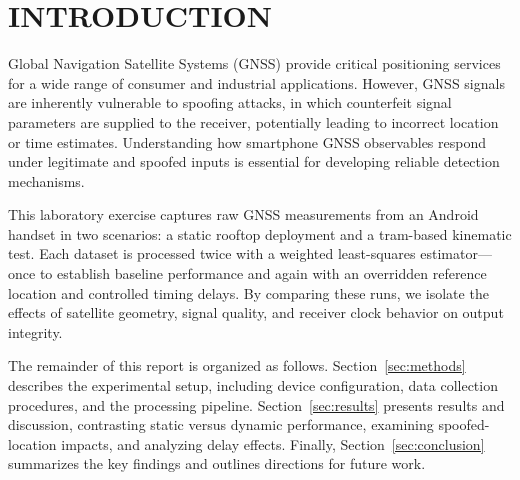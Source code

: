 
\section{INTRODUCTION} \label{sec:introduction}


    Global Navigation Satellite Systems (GNSS) provide critical positioning services for a wide range of consumer and industrial applications. 
    However, GNSS signals are inherently vulnerable to spoofing attacks, in which counterfeit signal parameters are supplied to the receiver, potentially leading to incorrect location or time estimates. 
    Understanding how smartphone GNSS observables respond under legitimate and spoofed inputs is essential for developing reliable detection mechanisms.

    This laboratory exercise captures raw GNSS measurements from an Android handset in two scenarios: a static rooftop deployment and a tram-based kinematic test. 
    Each dataset is processed twice with a weighted least-squares estimator—once to establish baseline performance and again with an overridden reference location and controlled timing delays. 
    By comparing these runs, we isolate the effects of satellite geometry, signal quality, and receiver clock behavior on output integrity.

    The remainder of this report is organized as follows. Section~\ref{sec:methods} describes the experimental setup, including device configuration, data collection procedures, and the processing pipeline. 
    Section~\ref{sec:results} presents results and discussion, contrasting static versus dynamic performance, examining spoofed-location impacts, and analyzing delay effects. 
    Finally, Section~\ref{sec:conclusion} summarizes the key findings and outlines directions for future work.
